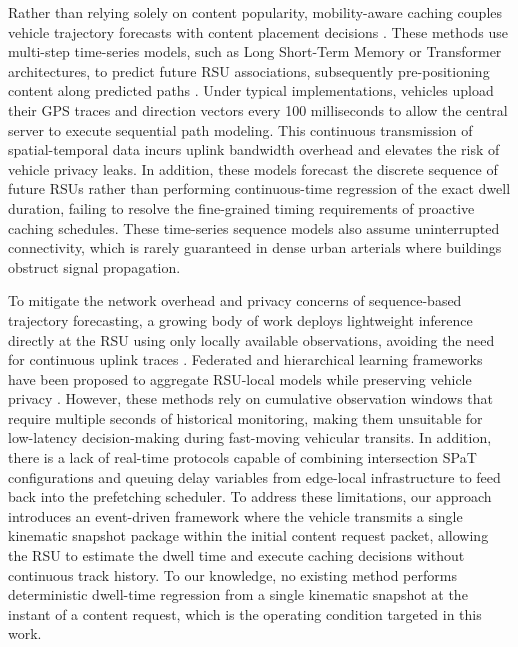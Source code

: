 \documentclass[journal]{IEEEtran}
\begin{document}
Rather than relying solely on content popularity, mobility-aware caching couples vehicle trajectory forecasts with content placement decisions \cite{7,9,23}. These methods use multi-step time-series models, such as Long Short-Term Memory or Transformer architectures, to predict future RSU associations, subsequently pre-positioning content along predicted paths \cite{4,8}. Under typical implementations, vehicles upload their GPS traces and direction vectors every 100 milliseconds to allow the central server to execute sequential path modeling. This continuous transmission of spatial-temporal data incurs uplink bandwidth overhead and elevates the risk of vehicle privacy leaks. In addition, these models forecast the discrete sequence of future RSUs rather than performing continuous-time regression of the exact dwell duration, failing to resolve the fine-grained timing requirements of proactive caching schedules. These time-series sequence models also assume uninterrupted connectivity, which is rarely guaranteed in dense urban arterials where buildings obstruct signal propagation.

To mitigate the network overhead and privacy concerns of sequence-based trajectory forecasting, a growing body of work deploys lightweight inference directly at the RSU using only locally available observations, avoiding the need for continuous uplink traces \cite{11,24,25}. Federated and hierarchical learning frameworks have been proposed to aggregate RSU-local models while preserving vehicle privacy \cite{10,26,27}. However, these methods rely on cumulative observation windows that require multiple seconds of historical monitoring, making them unsuitable for low-latency decision-making during fast-moving vehicular transits. In addition, there is a lack of real-time protocols capable of combining intersection SPaT configurations and queuing delay variables from edge-local infrastructure to feed back into the prefetching scheduler. To address these limitations, our approach introduces an event-driven framework where the vehicle transmits a single kinematic snapshot package within the initial content request packet, allowing the RSU to estimate the dwell time and execute caching decisions without continuous track history. To our knowledge, no existing method performs deterministic dwell-time regression from a single kinematic snapshot at the instant of a content request, which is the operating condition targeted in this work.
\end{document}
